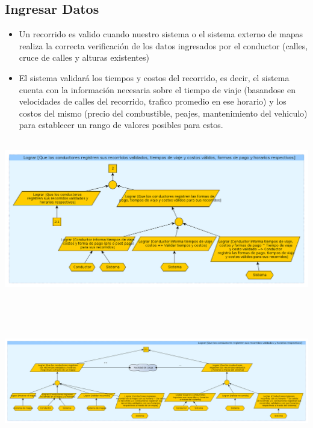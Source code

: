 \documentclass[a4paper,titlepage,10pt]{article}
\begin{document}
\subsection{Ingresar Datos}
\begin{itemize}
\item Un recorrido es valido cuando nuestro sistema o el sistema externo de mapas realiza la correcta verificación de los datos ingresados por el conductor (calles, cruce de calles y alturas existentes)
\item El sistema validará los tiempos y costos del recorrido, es decir, el sistema cuenta con la información necesaria sobre el tiempo de viaje (basandose en velocidades de calles del recorrido, trafico promedio en ese horario) y los costos del mismo (precio del combustible, peajes, mantenimiento del vehiculo) para establecer un rango de valores posibles para estos.
\end{itemize}
\includegraphics[height=7cm,width=19.5cm]{imagenes/Ingresenrecorridos.png}
\includegraphics[height=7cm,width=19.5cm]{imagenes/Ingresenrecorridosa.png}

\newpage
\end{document}
